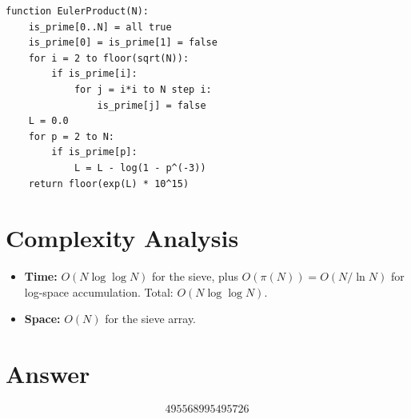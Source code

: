 \documentclass[11pt]{article}
\begin{document}
\begin{verbatim}
function EulerProduct(N):
    is_prime[0..N] = all true
    is_prime[0] = is_prime[1] = false
    for i = 2 to floor(sqrt(N)):
        if is_prime[i]:
            for j = i*i to N step i:
                is_prime[j] = false
    L = 0.0
    for p = 2 to N:
        if is_prime[p]:
            L = L - log(1 - p^(-3))
    return floor(exp(L) * 10^15)
\end{verbatim}

\section{Complexity Analysis}

\begin{itemize}
\item \textbf{Time:} $O(N \log\log N)$ for the sieve, plus $O(\pi(N)) = O(N/\ln N)$ for log-space accumulation. Total: $O(N \log\log N)$.
\item \textbf{Space:} $O(N)$ for the sieve array.
\end{itemize}

\section{Answer}

\[
\boxed{495568995495726}
\]
\end{document}
